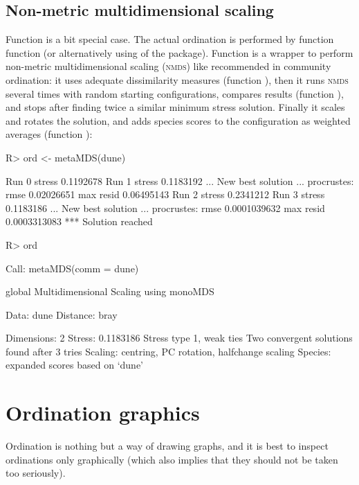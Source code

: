 \documentclass[article,nojss]{jss}
\begin{document}
\subsection{Non-metric multidimensional scaling}


Function  is a bit special case.  The actual ordination
is performed by function  function  (or
alternatively using  of the  package).
Function  is a wrapper to perform non-metric
multidimensional scaling (\textsc{nmds}) like recommended in community
ordination: it uses adequate dissimilarity measures (function
), then it runs \textsc{nmds} several times with random
starting configurations, compares results (function
), and stops after finding twice a similar minimum
stress solution.  Finally it scales and rotates the solution, and adds
species scores to the configuration as weighted averages (function
):
\begin{Schunk}
\begin{Sinput}
R> ord <- metaMDS(dune)
\end{Sinput}
\begin{Soutput}
Run 0 stress 0.1192678 
Run 1 stress 0.1183192 
... New best solution
... procrustes: rmse 0.02026651  max resid 0.06495143 
Run 2 stress 0.2341212 
Run 3 stress 0.1183186 
... New best solution
... procrustes: rmse 0.0001039632  max resid 0.0003313083 
*** Solution reached
\end{Soutput}
\begin{Sinput}
R> ord
\end{Sinput}
\begin{Soutput}
Call:
metaMDS(comm = dune) 

global Multidimensional Scaling using monoMDS

Data:     dune 
Distance: bray 

Dimensions: 2 
Stress:     0.1183186 
Stress type 1, weak ties
Two convergent solutions found after 3 tries
Scaling: centring, PC rotation, halfchange scaling 
Species: expanded scores based on ‘dune’ 
\end{Soutput}
\end{Schunk}

\section{Ordination graphics}

Ordination is nothing but a way of drawing graphs, and it is best to
inspect ordinations only graphically (which also implies that they
should not be taken too seriously).
\end{document}
